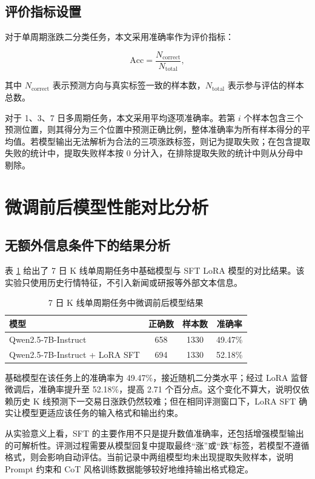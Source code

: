\subsection{评价指标设置}

对于单周期涨跌二分类任务，本文采用准确率作为评价指标：

\[
\mathrm{Acc}=\frac{N_{\mathrm{correct}}}{N_{\mathrm{total}}},
\]

其中 \(N_{\mathrm{correct}}\) 表示预测方向与真实标签一致的样本数，\(N_{\mathrm{total}}\) 表示参与评估的样本总数。

对于 1、3、7 日多周期任务，本文采用平均逐项准确率。若第 \(i\) 个样本包含三个预测位置，则其得分为三个位置中预测正确比例，整体准确率为所有样本得分的平均值。若模型输出无法解析为合法的三项涨跌标签，则记为提取失败；在包含提取失败的统计中，提取失败样本按 0 分计入，在排除提取失败的统计中则从分母中剔除。

\section{微调前后模型性能对比分析}

\subsection{无额外信息条件下的结果分析}

表 \ref{tab:sft-compare} 给出了 7 日 K 线单周期任务中基础模型与 SFT LoRA 模型的对比结果。该实验只使用历史行情特征，不引入新闻或研报等外部文本信息。

\begin{table}[htbp]
  \centering
  \caption{7 日 K 线单周期任务中微调前后模型结果}
  \label{tab:sft-compare}
  \begin{tabular}{lccc}
    \toprule
    模型 & 正确数 & 样本数 & 准确率 \\
    \midrule
    Qwen2.5-7B-Instruct & 658 & 1330 & 49.47\% \\
    Qwen2.5-7B-Instruct + LoRA SFT & 694 & 1330 & 52.18\% \\
    \bottomrule
  \end{tabular}
\end{table}

基础模型在该任务上的准确率为 49.47\%，接近随机二分类水平；经过 LoRA 监督微调后，准确率提升至 52.18\%，提高 2.71 个百分点。这个变化不算大，说明仅依赖历史 K 线预测下一交易日涨跌仍然较难；但在相同评测窗口下，LoRA SFT 确实让模型更适应该任务的输入格式和输出约束。

从实验意义上看，SFT 的主要作用不只是提升数值准确率，还包括增强模型输出的可解析性。评测过程需要从模型回复中提取最终“涨”或“跌”标签，若模型不遵循格式，则会影响自动评估。当前记录中两组模型均未出现提取失败样本，说明 Prompt 约束和 CoT 风格训练数据能够较好地维持输出格式稳定。

